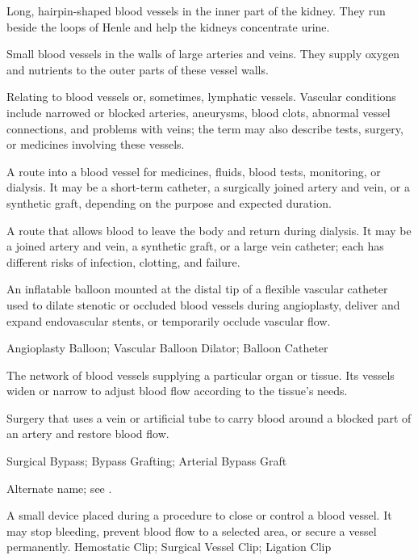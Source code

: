  Long, hairpin-shaped blood vessels in the inner part of the kidney. They run beside the loops of Henle and help the kidneys concentrate urine.

 Small blood vessels in the walls of large arteries and veins. They supply oxygen and nutrients to the outer parts of these vessel walls.

 Relating to blood vessels or, sometimes, lymphatic vessels. Vascular conditions include narrowed or blocked arteries, aneurysms, blood clots, abnormal vessel connections, and problems with veins; the term may also describe tests, surgery, or medicines involving these vessels.

 A route into a blood vessel for medicines, fluids, blood tests, monitoring, or dialysis. It may be a short-term catheter, a surgically joined artery and vein, or a synthetic graft, depending on the purpose and expected duration.

 A route that allows blood to leave the body and return during dialysis. It may be a joined artery and vein, a synthetic graft, or a large vein catheter; each has different risks of infection, clotting, and failure.

 An inflatable balloon mounted at the distal tip of a flexible vascular catheter used to dilate stenotic or occluded blood vessels during angioplasty, deliver and expand endovascular stents, or temporarily occlude vascular flow.

\synonyms
Angioplasty Balloon; Vascular Balloon Dilator; Balloon Catheter

 The network of blood vessels supplying a particular organ or tissue. Its vessels widen or narrow to adjust blood flow according to the tissue’s needs.

 Surgery that uses a vein or artificial tube to carry blood around a blocked part of an artery and restore blood flow.

\synonyms
Surgical Bypass; Bypass Grafting; Arterial Bypass Graft

 Alternate name; see .

 A small device placed during a procedure to close or control a blood vessel. It may stop bleeding, prevent blood flow to a selected area, or secure a vessel permanently.
\synonyms
Hemostatic Clip; Surgical Vessel Clip; Ligation Clip

